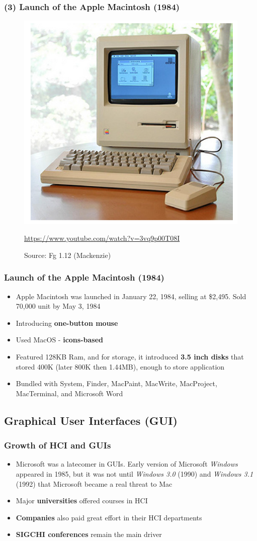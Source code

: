 \documentclass{beamer}
\begin{document}
\begin{frame}
\frametitle{(3) Launch of the Apple Macintosh (1984)}
\begin{figure}
	\includegraphics[width=0.5\linewidth]{mac2}
	\caption{Source: Fg 1.12 (Mackenzie)}
	\url{https://www.youtube.com/watch?v=3vq9p00T08I}
\end{figure}
\end{frame}

\begin{frame}
\frametitle{Launch of the Apple Macintosh (1984)}
\begin{itemize}
	\item Apple Macintosh was launched in January 22, 1984, selling at \$2,495.  Sold 70,000 unit by May 3, 1984
	\item Introducing \textbf{one-button mouse}
	\item Used MacOS - \textbf{icons-based}
	\item Featured 128KB Ram, and for storage, it introduced \textbf{3.5 inch disks} that stored 400K (later 800K then 1.44MB), enough to store application
	\item Bundled with System, Finder, MacPaint, MacWrite, MacProject, MacTerminal, and Microsoft Word
\end{itemize}
\end{frame}

\subsection{Graphical User Interfaces (GUI)} %

\begin{frame}
\frametitle{Growth of HCI and GUIs}
\begin{itemize}
	\item Microsoft was a latecomer in GUIs.  Early version of Microsoft \textit{Windows} appeared in 1985, but it was not until \textit{Windows 3.0} (1990) and \textit{Windows 3.1} (1992) that Microsoft became a real threat to Mac
	\item Major \textbf{universities} offered courses in HCI
	\item \textbf{Companies} also paid great effort in their HCI departments
	\item \textbf{SIGCHI conferences} remain the main driver
\end{itemize}
\end{frame}
\end{document}
